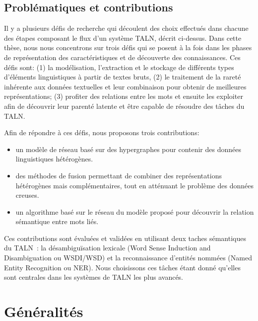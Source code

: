 \documentclass[a4paper,11pt,twoside]{article}
\begin{document}
\subsection{Problématiques et contributions}

Il y a plusieurs défis de recherche qui découlent des choix effectués dans chacune des étapes composant le flux d'un système TALN, décrit ci-dessus. Dans cette thèse, nous nous concentrons sur trois défis qui se posent à la fois dans les phases de représentation des caractéristiques et de découverte des connaissances. Ces défis sont: (1) la modélisation, l'extraction et le stockage de différents types d'éléments linguistiques à partir de textes bruts, (2) le traitement de la rareté inhérente aux données textuelles et leur combinaison pour obtenir de meilleures représentations; (3) profiter des relations entre les mots et ensuite les exploiter afin de découvrir leur parenté latente et être capable de résoudre des tâches du TALN.

Afin de répondre à ces défis, nous proposons trois contributions:
\begin{itemize}
\item un modèle de réseau basé sur des hypergraphes pour contenir des données linguistiques hétérogènes.
\item des méthodes de fusion permettant de combiner des représentations hétérogènes mais complémentaires, tout en atténuant le problème des données creuses.
\item un algorithme basé sur le réseau du modèle proposé pour découvrir la relation sémantique entre mots liés.
\end{itemize}

Ces contributions sont évaluées et validées en utilisant deux taches sémantiques du TALN~: la désambiguïsation lexicale (Word Sense Induction and Disambiguation ou WSDI/WSD) et la reconnaissance d'entités nommées (Named Entity Recognition ou NER). Nous choisissons  ces tâches étant donné qu'elles sont centrales dans les systèmes de TALN les plus avancés.

\section{Généralités}
\end{document}
